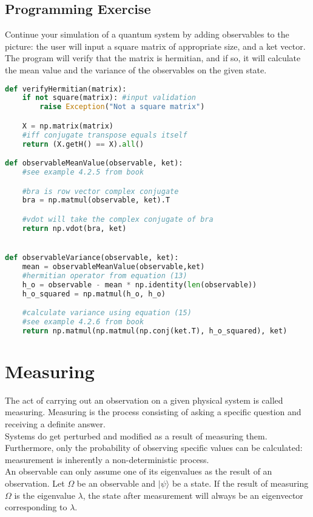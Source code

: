 \documentclass{article}
\begin{document}
\subsection{Programming Exercise}
Continue your simulation of a quantum system by adding observables to the picture: the user will input a square matrix of appropriate size, and a ket vector. The program will verify that the matrix is hermitian, and if so, it will calculate the mean value and the variance of the observables on the given state.\\
\begin{lstlisting}[language=Python]
def verifyHermitian(matrix):
    if not square(matrix): #input validation
        raise Exception("Not a square matrix")

    X = np.matrix(matrix)
    #iff conjugate transpose equals itself
    return (X.getH() == X).all()

def observableMeanValue(observable, ket):
    #see example 4.2.5 from book

    #bra is row vector complex conjugate
    bra = np.matmul(observable, ket).T

    #vdot will take the complex conjugate of bra
    return np.vdot(bra, ket)


def observableVariance(observable, ket):
    mean = observableMeanValue(observable,ket)
    #hermitian operator from equation (13)
    h_o = observable - mean * np.identity(len(observable))
    h_o_squared = np.matmul(h_o, h_o)

    #calculate variance using equation (15)
    #see example 4.2.6 from book
    return np.matmul(np.matmul(np.conj(ket.T), h_o_squared), ket)
\end{lstlisting}
\section{Measuring}

The act of carrying out an observation on a given physical system is called measuring. Measuring is the process consisting of asking a specific question and receiving a definite answer.\\

Systems do get perturbed and modified as a result of measuring them. Furthermore, only the probability of observing specific values can be calculated: measurement is inherently a non-deterministic process.\\

An observable can only assume one of its eigenvalues as the result of an observation. Let $\Omega$ be an observable and $|\psi\rangle$ be a state. If the result of measuring $\Omega$ is the eigenvalue $\lambda$, the state after measurement will always be an eigenvector corresponding to $\lambda$.\\
\end{document}
